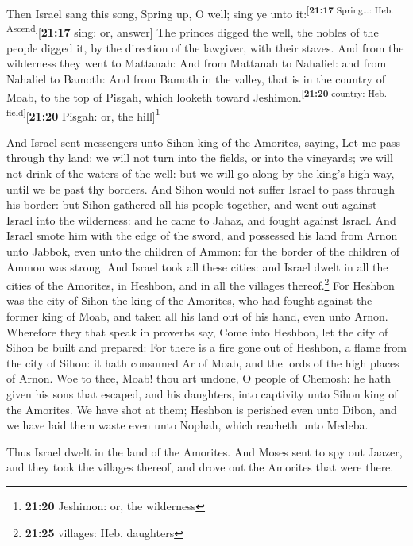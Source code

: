  Then Israel sang this song, Spring up, O well; sing ye
unto it:\textsuperscript{{[}\textbf{21:17} Spring\ldots: Heb.
Ascend{]}}{[}\textbf{21:17} sing: or, answer{]}  The
princes digged the well, the nobles of the people digged it, by the
direction of the lawgiver, with their staves. And from the wilderness
they went to Mattanah:  And from Mattanah to Nahaliel:
and from Nahaliel to Bamoth:  And from Bamoth in the
valley, that is in the country of Moab, to the top of Pisgah, which
looketh toward Jeshimon.\textsuperscript{{[}\textbf{21:20} country: Heb.
field{]}}{[}\textbf{21:20} Pisgah: or, the hill{]}\footnote{\textbf{21:20}
  Jeshimon: or, the wilderness}

 And Israel sent messengers unto Sihon king of the
Amorites, saying,  Let me pass through thy land: we will
not turn into the fields, or into the vineyards; we will not drink of
the waters of the well: but we will go along by the king's high way,
until we be past thy borders.  And Sihon would not suffer
Israel to pass through his border: but Sihon gathered all his people
together, and went out against Israel into the wilderness: and he came
to Jahaz, and fought against Israel.  And Israel smote
him with the edge of the sword, and possessed his land from Arnon unto
Jabbok, even unto the children of Ammon: for the border of the children
of Ammon was strong.  And Israel took all these cities:
and Israel dwelt in all the cities of the Amorites, in Heshbon, and in
all the villages thereof.\footnote{\textbf{21:25} villages: Heb.
  daughters}  For Heshbon was the city of Sihon the king
of the Amorites, who had fought against the former king of Moab, and
taken all his land out of his hand, even unto Arnon. 
Wherefore they that speak in proverbs say, Come into Heshbon, let the
city of Sihon be built and prepared:  For there is a fire
gone out of Heshbon, a flame from the city of Sihon: it hath consumed Ar
of Moab, and the lords of the high places of Arnon.  Woe
to thee, Moab! thou art undone, O people of Chemosh: he hath given his
sons that escaped, and his daughters, into captivity unto Sihon king of
the Amorites.  We have shot at them; Heshbon is perished
even unto Dibon, and we have laid them waste even unto Nophah, which
reacheth unto Medeba.

 Thus Israel dwelt in the land of the Amorites.
 And Moses sent to spy out Jaazer, and they took the
villages thereof, and drove out the Amorites that were there.

